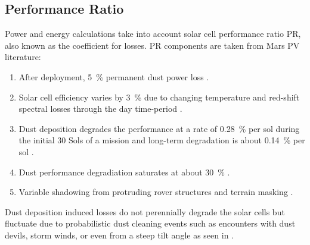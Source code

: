 \subsection{Performance Ratio}
\label{sec:PowerAndEnergyPredictions:PerformanceRatio}
Power and energy calculations take into account solar cell performance ratio \ac{PR}, also known as the coefficient for losses. \ac{PR} components are taken from Mars \ac{PV} literature:

\begin{enumerate}[label=\textbf{\textcolor{BulletBlue}{(\alph*)}}]
  \item\label{itm:pr:perm_loss}After deployment, \SI{5}{\percent} permanent dust power loss .
  \item\label{itm:pr:temp}Solar cell efficiency varies by \SI{3}{\percent} due to changing temperature and red-shift spectral losses through the day time-period .
  \item\label{itm:pr:deposition}Dust deposition degrades the performance at a rate of \SI{0.28}{\percent} per sol during the initial 30 Sols of a mission and long-term degradation is about \SI{0.14}{\percent} per sol .
  \item\label{itm:pr:saturation}Dust performance degradiation saturates at about \SI{30}{\percent} .
  \item\label{itm:pr:shadowing}Variable shadowing from protruding rover structures  and terrain masking .
\end{enumerate}


Dust deposition induced losses do not perennially degrade the solar cells but fluctuate due to probabilistic dust cleaning events such as encounters with dust devils, storm winds, or even from a steep tilt angle as seen in .

